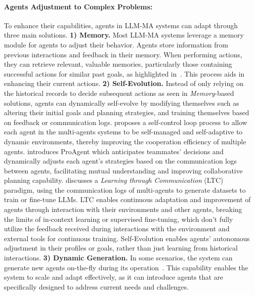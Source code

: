 \paragraph{Agents Adjustment to Complex Problems:} 
To enhance their capabilities, agents in LLM-MA systems can adapt through three main solutions.
\textbf{1) Memory.} Most LLM-MA systems leverage a memory module for agents to adjust their behavior. Agents store information from previous interactions and feedback in their memory. When performing actions, they can retrieve relevant, valuable memories, particularly those containing successful actions for similar past goals, as highlighted in~\cite{wang2023survey}. This process aids in enhancing their current actions.  
\textbf{2) Self-Evolution.}  Instead of  {only relying on the historical records to decide subsequent actions as seen in  \emph{Memory}-based solutions, agents can dynamically self-evolve by modifying themselves such as altering their initial goals and planning strategies, and training themselves based on feedback or communication logs. \cite{nascimento2023self} proposes a self-control loop process to allow each agent in the multi-agents systems to be self-managed and self-adaptive to dynamic environments, thereby improving the cooperation efficiency of multiple agents. {
\cite{zhang2023proagent} introduces ProAgent which anticipates teammates' decisions and dynamically adjusts each agent's strategies based on the communication logs between agents, facilitating mutual understanding and improving collaborative planning capability.} \cite{wang2023adapting} discusses a  \emph{Learning through Communication} (LTC) paradigm, using the communication logs of multi-agents to generate datasets to train or fine-tune LLMs. LTC enables continuous adaptation and improvement of agents through interaction with their environments and other agents, breaking the limits of in-context learning or supervised fine-tuning, which don't fully utilize the feedback received during interactions with the environment and external tools for continuous training. Self-Evolution enables agents' autonomous adjustment in their profiles or goals, rather than just learning from historical interactions.} 
\textbf{3) Dynamic Generation.} In some scenarios,   the system can generate new agents on-the-fly during its operation~\cite{chen2023autoagents,chen2023agentverse}. This capability enables the system to scale and adapt effectively, as it can introduce agents that are specifically designed to address current needs and challenges. 

